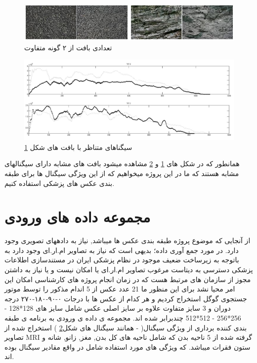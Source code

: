 \documentclass[10pt,a4paper]{article}
\begin{document}
\begin{figure}[H]
    \centering
    \includegraphics[width=1\textwidth]{txt-1}
    \caption{تعدادی بافت از ۲ گونه متفاوت}
    \label{fig:حروف}
\end{figure}
\begin{figure}[H]
    \centering
    \includegraphics[width=1\textwidth]{txt-2}
    \caption{سیگناهای
متناظر با بافت های شکل
\ref{fig:حروف}
    }
    \label{fig:سیگنال-حروف}
\end{figure}

همانطور که در شکل های
\ref{fig:حروف}
و
\ref{fig:سیگنال-حروف}
مشاهده میشود بافت های مشابه دارای سیگنالهای مشابه هستند که ما در این پروژه میخواهیم که از این ویژگی سیگنال ها برای طبقه بندی عکس های پزشکی استفاده کنیم.

\section{مجموعه داده های ورودی}
از آنجایی که موضوع پروژه طبقه بندی عکس ها می­باشد, نیاز به داده­های تصویری وجود دارد. در مورد جمع آوری داده؛ بدیهی است که نیاز به تصاویر ام.ار.ای وجود دارد به باتوجه به زیرساخت ضعیف موجود در نظام پزشکی ایران در مستندسازی اطلاعات پزشکی دسترسی به دیتاست مرغوب تصاویر ام.ار.ای یا امکان نیست و یا نیاز به داشتن مجوز از سازمان های مرتبط هست که در زمان انجام پروژه های کارشناسی امکان این امر محیا نشد برای این منظور ما 21 عدد عکس از 5 اندام مذکور را توسط موتور جستجوی گوگل استخراج کردیم و هر کدام از عکس ها با درجات ۰-۹۰-۱۸۰-۲۷۰ درجه دوران و 3 سایز متفاوت علاوه بر سایز اصلی عکس شامل سایز های {128*128 - 256*256 - 512*512} چندبرابر شده اند.
مجموعه ی داده ی ورودی به برنامه ی طبقه بندی کننده برداری از ویژگی سیگنال(
 - 
همانند سیگنال های شکل\ref{fig:سیگنال-حروف}
) استخراج شده از تصاویر MRI گرفته شده از 5 ناحیه بدن که شامل ناحیه های کل بدن, مغز, زانو, شانه و ستون فقرات میباشد. که ویژگی های مورد استفاده شامل در واقع مقادیر سیگنال بوده اند.
\end{document}
